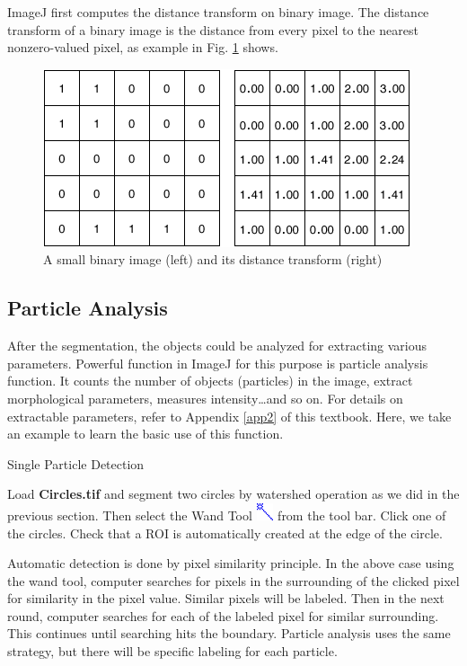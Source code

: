 ImageJ first computes the distance transform on binary image. The distance transform of
a binary image is the distance from every pixel to the nearest nonzero-valued pixel, as example in Fig. \ref{fig:img118} shows.
\begin{figure}[htbp]
\begin{center}
\includegraphics[width=10.85cm,height=5.242cm]{fig/CMCIBasicCourse201102-img118.png}
\caption{ A small binary image (left) and its distance transform (right)}
\label{fig:img118}
\end{center}
\end{figure}


\subsection{Particle Analysis}

After the segmentation, the objects could be analyzed for extracting various
parameters. Powerful function in ImageJ for this purpose is particle
analysis function. It counts the number of objects (particles) in the
image, extract morphological parameters, measures intensity\ldots and
so on. For details on extractable parameters, refer to Appendix
\ref{app2} of this textbook. Here, we take an example to learn the basic use of
this function.  

\begin{indentexercise}{1}
Single Particle Detection

Load \textbf{Circles.tif} and segment two circles by watershed operation
as we did in the previous section. Then select the Wand Tool 
\includegraphics[width=0.5cm]{fig/CMCIBasicCourse201102-img119.png}
 from the tool bar. Click one of the circles. Check that a ROI is
automatically created at the edge of the circle.
\end{indentexercise}

Automatic detection is done by pixel similarity principle. In the above
case using the wand tool, computer searches for pixels in the
surrounding of the clicked pixel for similarity in the pixel value.
Similar pixels will be labeled. Then in the next round, computer
searches for each of the labeled pixel for similar surrounding. This
continues until searching hits the boundary. Particle analysis uses the
same strategy, but there will be specific labeling for each particle.

